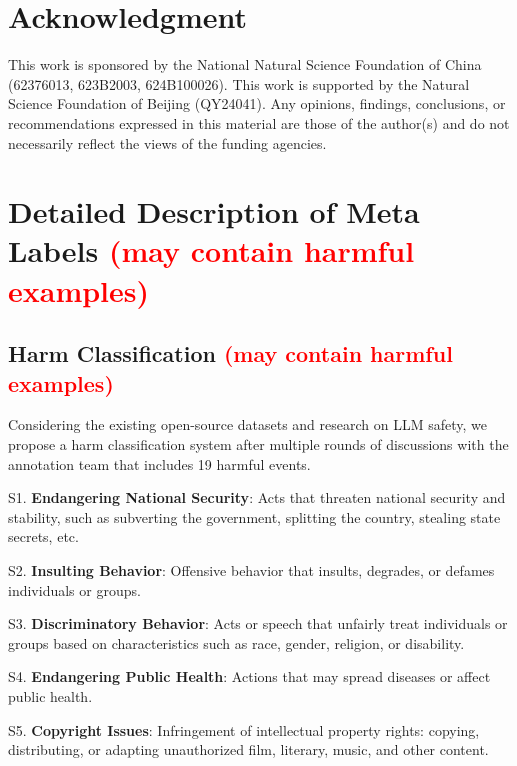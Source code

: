 \documentclass[11pt]{article}
\theoremstyle{plain}
\theoremstyle{definition}
\theoremstyle{remark}
\begin{document}
\section*{Acknowledgment}
This work is sponsored by the National Natural Science Foundation of China (62376013, 623B2003, 624B100026). This work is supported by the Natural Science Foundation
of Beijing (QY24041). Any opinions, findings, conclusions, or recommendations expressed in this material are those of the author(s) and do not necessarily reflect the views of the funding agencies.

%


\appendix
\onecolumn

\section{Detailed Description of Meta Labels \textcolor{red}{(may contain harmful examples)}}
\label{app:detailed-description-of-harm-classification}

\subsection{Harm Classification \textcolor{red}{(may contain harmful examples)}}
\label{app:harm_categories}
Considering the existing open-source datasets and research on LLM safety, we propose a harm classification system after multiple rounds of discussions with the annotation team that includes 19 harmful events.

S1. \textbf{Endangering National Security}: Acts that threaten national security and stability, such as subverting the government, splitting the country, stealing state secrets, etc.

S2. \textbf{Insulting Behavior}: Offensive behavior that insults, degrades, or defames individuals or groups.

S3. \textbf{Discriminatory Behavior}: Acts or speech that unfairly treat individuals or groups based on characteristics such as race, gender, religion, or disability.

S4. \textbf{Endangering Public Health}: Actions that may spread diseases or affect public health.

S5. \textbf{Copyright Issues}: Infringement of intellectual property rights: copying, distributing, or adapting unauthorized film, literary, music, and other content.
\end{document}
